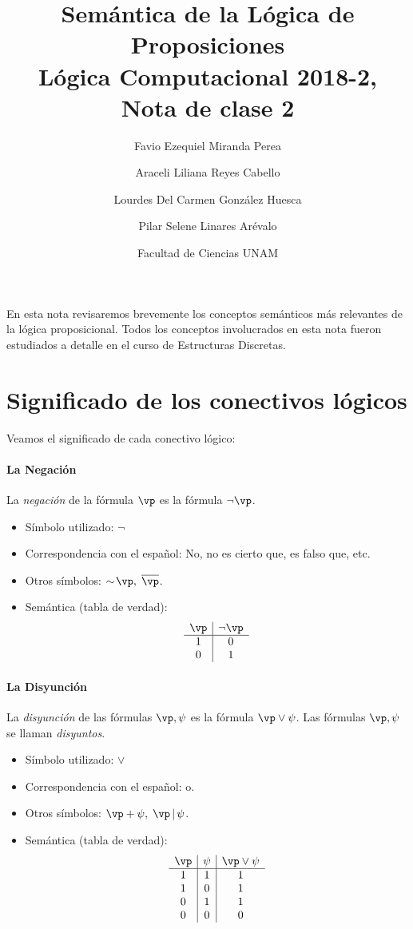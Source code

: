 \documentclass[11pt,letterpaper]{article}
\title{Sem\'antica de la L\'ogica de Proposiciones \\ 
L\'ogica Computacional 2018-2, Nota de clase 2}
\author{Favio Ezequiel Miranda Perea\and Araceli Liliana Reyes Cabello\and
Lourdes Del Carmen Gonz\'alez Huesca \and Pilar Selene Linares Ar\'evalo}
\date{Facultad de Ciencias UNAM}
\begin{document}
\maketitle

En esta nota revisaremos brevemente los conceptos sem\'anticos m\'as relevantes 
de la l\'ogica proposicional. Todos los conceptos involucrados en esta nota 
fueron estudiados a detalle en el curso de Estructuras Discretas.

\section{Significado de los conectivos l\'ogicos}

\noindent Veamos el significado de cada conectivo l\'ogico:

\paragraph{La Negaci\'on}
La \emph{negaci\'on} de la f\'ormula $\vp$ es la f\'ormula $\lnot \vp$.

\begin{itemize}
 \item S\'imbolo utilizado:  $\lnot$ 
 \item Correspondencia con el espa\~nol: No, no es cierto que, es falso que, 
  etc.
 \item Otros s\'imbolos: $\sim\!\vp,\; \overline{\vp}$. 
 \item Sem\'antica (tabla de verdad):
  \[ 
   \begin{array}{c|c}
    \vp & \lnot \vp \\ \hline 
    1 & 0\\ 
    0 & 1 
   \end{array}
  \]
\end{itemize}


\paragraph{La Disyunci\'on}
La \emph{disyunci\'on} de las f\'ormulas $\vp,\psi$ es la f\'ormula
$\vp\lor \psi$. 
Las f\'ormulas $\vp,\psi$ se llaman \emph{disyuntos}. 

\begin{itemize}
 \item S\'imbolo utilizado: $\lor$
 \item Correspondencia con el espa\~nol: o. 
 \item Otros s\'imbolos: $\vp+\psi,\;\vp\,|\,\psi$. 
 \item Sem\'antica (tabla de verdad):  
  \[
   \begin{array}{c|c|c}
    \vp & \psi & \vp\lor \psi\\ \hline 
    1 & 1 & 1\\
    1 & 0 & 1\\
    0 & 1 & 1\\
    0 & 0 & 0\\
   \end{array}
  \]
\end{itemize}
\end{document}
